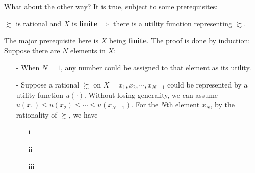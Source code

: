 What about the other way? It is true, subject to some prerequisites:
\begin{theorem}\label{thm_rational_has_utility}
    $\succsim$ is rational and $X$ is \textbf{finite} $\Rightarrow$ there is a utility function representing $\succsim$.
\end{theorem}

The major prerequisite here is $X$ being \textbf{finite}. The proof is done by induction: Suppose there are $N$ elements in $X$:
\begin{enumerate}
    \item[-] When $N=1$, any number could be assigned to that element as its utility.
    \item[-] Suppose a rational $\succsim$ on $X={x_1,x_2,\cdots,x_{N-1 }}$ could be represented by a utility function $u(\cdot)$. Without losing generality, we can assume $u(x_1)\leq u(x_2)\leq\cdots\leq u(x_{N-1})$. For the $N$th element $x_N$, by the rationality of $\succsim$, we have
    \begin{enumerate}
        \item[i] 
        \item[ii]
        \item[iii]   
    \end{enumerate} 
\end{enumerate}